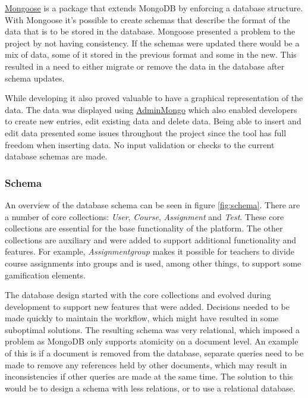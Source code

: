 \href{http://www.mongoosejs.com}{Mongoose} is a package that extends MongoDB by enforcing a database structure. With Mongoose it's possible to create schemas that describe the format of the data that is to be stored in the database. Mongoose presented a problem to the project by not having consistency. If the schemas were updated there would be a mix of data, some of it stored in the previous format and some in the new. This resulted in a need to either migrate or remove the data in the database after schema updates.

While developing it also proved valuable to have a graphical representation of the data. The data was displayed using \href{https://github.com/mrvautin/adminMongo}{AdminMongo} which also enabled developers to create new entries, edit existing data and delete data. Being able to insert and edit data presented some issues throughout the project since the tool has full freedom when inserting data. No input validation or checks to the current database schemas are made. 

\subsubsection{Schema}
An overview of the database schema can be seen in figure \ref{fig:schema}. There are a number of core collections: \emph{User}, \emph{Course}, \emph{Assignment} and \emph{Test}. These core collections are essential for the base functionality of the platform. The other collections are auxiliary and were added to support additional functionality and features. For example, \emph{Assignmentgroup} makes it possible for teachers to divide course assignments into groups and is used, among other things, to support some gamification elements.

The database design started with the core collections and evolved during development to support new features that were added. Decisions needed to be made quickly to maintain the workflow, which might have resulted in some suboptimal solutions. The resulting schema was very relational, which imposed a problem as MongoDB only supports atomicity on a document level. An example of this is if a document is removed from the database, separate queries need to be made to remove any references held by other documents, which may result in inconsistencies if other queries are made at the same time. The solution to this would be to design a schema with less relations, or to use a relational database.

